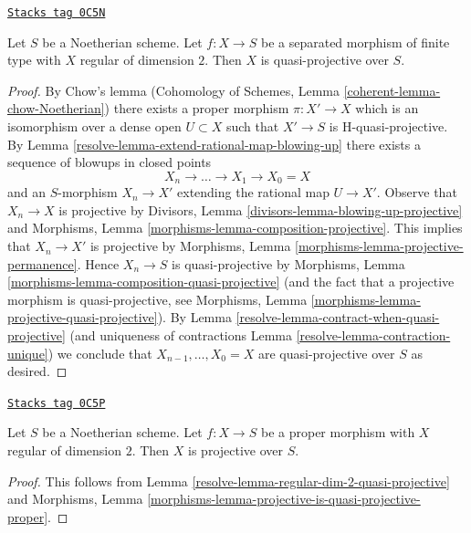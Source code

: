 \begin{lemma}
\label{resolve-lemma-regular-dim-2-quasi-projective}
\href{https://stacks.math.columbia.edu/tag/0C5N}{\texttt{Stacks tag 0C5N}}

Let $S$ be a Noetherian scheme. Let $f : X \to S$ be a
separated morphism of finite type with $X$ regular of dimension $2$.
Then $X$ is quasi-projective over $S$.
\end{lemma}

\begin{proof}

By Chow's lemma
(Cohomology of Schemes, Lemma \ref{coherent-lemma-chow-Noetherian})
there exists a proper morphism $\pi : X' \to X$ which is an isomorphism
over a dense open $U \subset X$ such that $X' \to S$ is H-quasi-projective.
By Lemma \ref{resolve-lemma-extend-rational-map-blowing-up}
there exists a sequence of blowups in closed points
$$
X_n \to \ldots \to X_1 \to X_0 = X
$$
and an $S$-morphism $X_n \to X'$ extending the rational map $U \to X'$.
Observe that $X_n \to X$ is projective by
Divisors, Lemma \ref{divisors-lemma-blowing-up-projective} and
Morphisms, Lemma \ref{morphisms-lemma-composition-projective}.
This implies that $X_n \to X'$ is projective by
Morphisms, Lemma \ref{morphisms-lemma-projective-permanence}.
Hence $X_n \to S$ is quasi-projective by
Morphisms, Lemma \ref{morphisms-lemma-composition-quasi-projective}
(and the fact that a projective morphism is quasi-projective, see
Morphisms, Lemma \ref{morphisms-lemma-projective-quasi-projective}).
By Lemma \ref{resolve-lemma-contract-when-quasi-projective}
(and uniqueness of contractions Lemma \ref{resolve-lemma-contraction-unique})
we conclude  that $X_{n - 1}, \ldots, X_0 = X$ are quasi-projective over $S$
as desired.
\end{proof}

\begin{lemma}
\label{resolve-lemma-regular-dim-2-projective}
\href{https://stacks.math.columbia.edu/tag/0C5P}{\texttt{Stacks tag 0C5P}}

Let $S$ be a Noetherian scheme. Let $f : X \to S$ be a
proper morphism with $X$ regular of dimension $2$.
Then $X$ is projective over $S$.
\end{lemma}

\begin{proof}

This follows from
Lemma \ref{resolve-lemma-regular-dim-2-quasi-projective} and
Morphisms, Lemma \ref{morphisms-lemma-projective-is-quasi-projective-proper}.
\end{proof}

